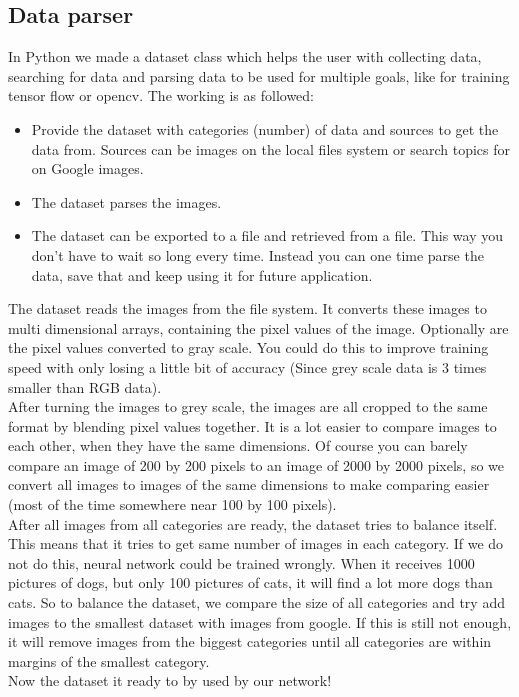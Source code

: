 \documentclass[fleqn,10pt]{SelfArx} %
\begin{document}
\subsection{Data parser}
In Python we made a dataset class which helps the user with collecting data, searching for data and parsing data to be used for multiple goals, like for training tensor flow or opencv. The working is as followed:
\begin{itemize}
    \item Provide the dataset with categories (number) of data and sources to get the data from. Sources can be images on the local files system or search topics for on Google images.
    \item The dataset parses the images.
    \item The dataset can be exported to a file and retrieved from a file. This way you don't have to wait so long every time. Instead you can one time parse the data, save that and keep using it for future application.


\end{itemize}
The dataset reads the images from the file system. It converts these images to multi dimensional arrays, containing the pixel values of the image. Optionally are the pixel values converted to gray scale. You could do this to improve training speed with only losing a little bit of accuracy (Since grey scale data is 3 times smaller than RGB data). \\
After turning the images to grey scale, the images are all cropped to the same format by blending pixel values together. It is a lot easier to compare images to each other, when they have the same dimensions. Of course you can barely compare an image of 200 by 200 pixels to an image of 2000 by 2000 pixels, so we convert all images to images of the same dimensions to make comparing easier (most of the time somewhere near 100 by 100 pixels). \\
After all images from all categories are ready, the dataset tries to balance itself. This means that it tries to get same number of images in each category. If we do not do this, neural network could be trained wrongly. When it receives 1000 pictures of dogs, but only 100 pictures of cats, it will find a lot more dogs than cats. So to balance the dataset, we compare the size of all categories and try add images to the smallest dataset with images from google. If this is still not enough, it will remove images from the biggest categories until all categories are within margins of the smallest category.\\
Now the dataset it ready to by used by our network!
\end{document}
